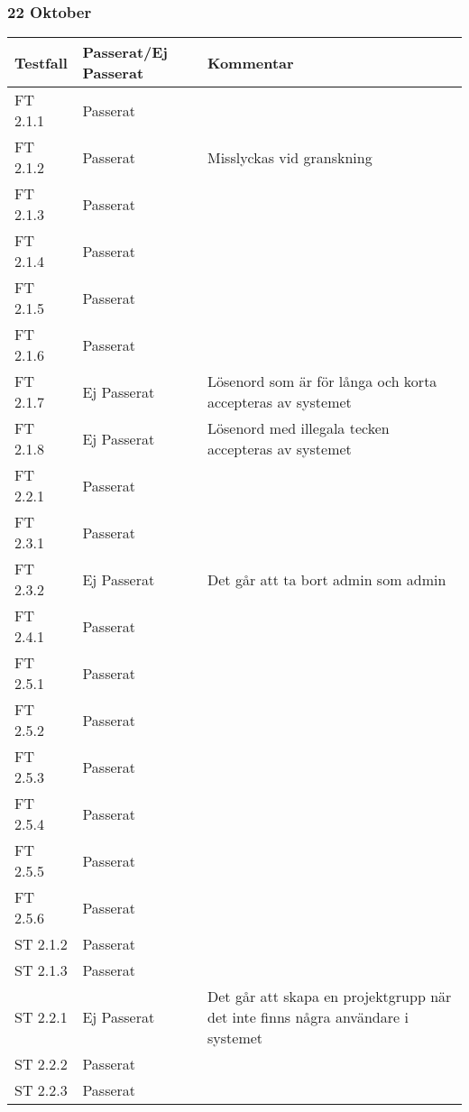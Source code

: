 \documentclass[a4paper]{article}
\begin{document}
\subsubsection{22 Oktober}
\begin{tabular}{| l | l | p{9cm} |}
\hline
Testfall &  Passerat/Ej Passerat & Kommentar\\
\hline
FT 2.1.1 & Passerat & \\
\hline
FT 2.1.2 & Passerat & Misslyckas vid granskning\\
\hline
FT 2.1.3 & Passerat & \\
\hline
FT 2.1.4 & Passerat & \\
\hline
FT 2.1.5 & Passerat & \\
\hline
FT 2.1.6 & Passerat & \\
\hline
FT 2.1.7 & Ej Passerat & Lösenord som är för långa och korta accepteras av systemet \\
\hline
FT 2.1.8 & Ej Passerat & Lösenord med illegala tecken accepteras av systemet \\
\hline
FT 2.2.1 & Passerat & \\
\hline
FT 2.3.1 & Passerat & \\
\hline
FT 2.3.2 & Ej Passerat & Det går att ta bort admin som admin\\
\hline
FT 2.4.1 & Passerat & \\
\hline
FT 2.5.1 & Passerat & \\
\hline
FT 2.5.2 & Passerat & \\
\hline
FT 2.5.3 & Passerat & \\
\hline
FT 2.5.4 & Passerat & \\
\hline
FT 2.5.5 & Passerat & \\
\hline
FT 2.5.6 & Passerat & \\
\hline
ST 2.1.2 & Passerat & \\
\hline
ST 2.1.3 & Passerat & \\
\hline
ST 2.2.1 & Ej Passerat & Det går att skapa en projektgrupp när det inte finns några användare i systemet\\
\hline
ST 2.2.2 & Passerat & \\
\hline
ST 2.2.3 & Passerat & \\
\hline
\end{tabular}
\end{document}
